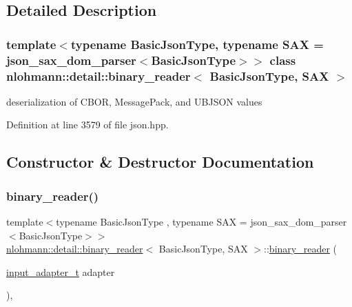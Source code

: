 \subsection{Detailed Description}
\subsubsection*{template$<$typename Basic\+Json\+Type, typename S\+AX = json\+\_\+sax\+\_\+dom\+\_\+parser$<$\+Basic\+Json\+Type$>$$>$\newline
class nlohmann\+::detail\+::binary\+\_\+reader$<$ Basic\+Json\+Type, S\+A\+X $>$}

deserialization of C\+B\+OR, Message\+Pack, and U\+B\+J\+S\+ON values 

Definition at line 3579 of file json.\+hpp.



\subsection{Constructor \& Destructor Documentation}
\mbox{\label{classnlohmann_1_1detail_1_1binary__reader_aed84f0302eb232d3b69f7653bef2337a}} 
\subsubsection{\texorpdfstring{binary\_reader()}{binary\_reader()}\hspace{0.1cm}{\footnotesize\ttfamily [1/3]}}
{\footnotesize\ttfamily template$<$typename Basic\+Json\+Type , typename S\+AX  = json\+\_\+sax\+\_\+dom\+\_\+parser$<$\+Basic\+Json\+Type$>$$>$ \\
\mbox{\hyperlink{classnlohmann_1_1detail_1_1binary__reader}{nlohmann\+::detail\+::binary\+\_\+reader}}$<$ Basic\+Json\+Type, S\+AX $>$\+::\mbox{\hyperlink{classnlohmann_1_1detail_1_1binary__reader}{binary\+\_\+reader}} (\begin{DoxyParamCaption}\item[{\mbox{\hyperlink{namespacenlohmann_1_1detail_ae132f8cd5bb24c5e9b40ad0eafedf1c2}{input\+\_\+adapter\+\_\+t}}}]{adapter }\end{DoxyParamCaption})\hspace{0.3cm}{\ttfamily [inline]}, {\ttfamily [explicit]}}



